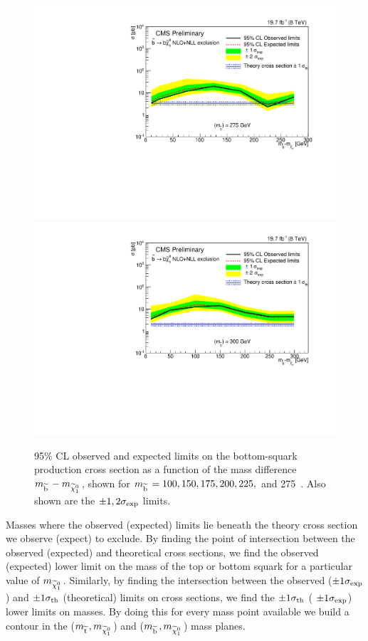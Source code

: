 \begin{figure}[!Hhtb]
\begin{center}
  \includegraphics[scale=0.39]{Figures/sus13009/limitplots/plots/sbottom/Limit_DM_sbottom_275.pdf}
    \includegraphics[scale=0.39]{Figures/sus13009/limitplots/plots/sbottom/Limit_DM_sbottom_300.pdf}
  \caption{95\% CL observed and expected limits on the bottom-squark production cross section as a function of the mass difference $m_{\widetilde{{\rm b}}\,} - m_{\widetilde{\chi}^{0}_{1}\,}$, shown for $m_{\widetilde{{\rm b}}\,} = 100, 150, 175, 200, 225,$ and 275~\GeV. 
  Also shown are the $\pm 1, 2 \sigma_{\rm exp}$ limits. 
 }
  \label{fig:sbottom_limits}
  \end{center}
\end{figure}




Masses where the observed (expected) limits lie beneath the theory cross section we observe (expect) to exclude.
By finding the point of intersection between the observed (expected) and theoretical cross sections, we find the observed (expected) lower limit on the mass of the top or bottom squark for a particular value of $m_{\widetilde{\chi}^{0}_{1}\,}$.
Similarly, by finding the intersection between the observed ($\pm 1 \sigma_{\rm exp}$) and $\pm 1 \sigma_{\rm th}$ (theoretical) limits on cross sections, we find the $\pm 1 \sigma_{\rm th}$ ( $\pm 1  \sigma_{\rm exp}$) lower limits on masses.
By doing this for every mass point available we build a contour in the ($m_{\widetilde{{\rm t}}\,},m_{\widetilde{\chi}^{0}_{1}\,}$) and ($m_{\widetilde{{\rm b}}\,},m_{\widetilde{\chi}^{0}_{1}\,}$) mass planes.


